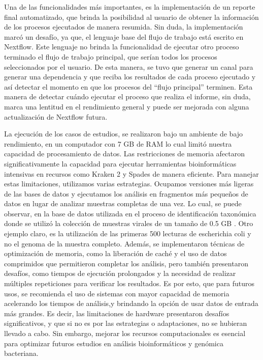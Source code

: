 \documentclass[12pt]{article}
\begin{document}
Una de las funcionalidades más importantes, es la implementación de un reporte final automatizado, que brinda la posibilidad al usuario de obtener la información de los procesos ejecutados de manera resumida. Sin duda, la implementación marcó un desafío, ya que, el lenguaje base del flujo de trabajo está escrito en Nextflow. Este lenguaje no brinda la funcionalidad de ejecutar otro proceso terminado el flujo de trabajo principal, que serían todos los procesos seleccionados por el usuario. De esta manera, se tuvo que generar un canal para generar una dependencia y que reciba los resultados de cada proceso ejecutado y así detectar el momento en que los procesos del “flujo principal” terminen. Esta manera de detectar cuándo ejecutar el proceso que realiza el informe, sin duda, marca una lentitud en el rendimiento general y puede ser mejorada con alguna actualización de Nextflow futura.

	
La ejecución de los casos de estudios, se realizaron bajo un ambiente de bajo rendimiento, en un computador con 7 GB de RAM lo cual limitó nuestra capacidad de procesamiento de datos. Las restricciones de memoria afectaron significativamente la capacidad para ejecutar herramientas bioinformáticas intensivas en recursos como Kraken 2 y Spades de manera eficiente. Para manejar estas limitaciones, utilizamos varias estrategias. Ocupamos versiones más ligeras de las bases de datos y ejecutamos los análisis en fragmentos más pequeños de datos en lugar de analizar muestras completas de una vez. Lo cual, se puede observar, en la base de datos utilizada en el proceso de identificación taxonómica donde se utilizó la colección de muestras virales de un tamaño de 0.5 GB . Otro ejemplo claro, es la utilización de las primeras 500 lecturas de escherichia coli y no el genoma de la muestra completo. Además, se implementaron técnicas de optimización de memoria, como la liberación de caché y el uso de datos comprimidos que permitieron completar los análisis, pero también presentaron desafíos, como tiempos de ejecución prolongados y la necesidad de realizar múltiples repeticiones para verificar los resultados. Es por esto, que para futuros usos, se recomienda el uso de sistemas con mayor capacidad de memoria acelerando los tiempos de análisis,y brindando la opción de usar datos de entrada más grandes. Es decir, las limitaciones de hardware presentaron desafíos significativos, y que si no es por las estrategias o adaptaciones, no se hubieran llevado a cabo. Sin embargo, mejorar los recursos computacionales es esencial para optimizar futuros estudios en análisis bioinformáticos y genómica bacteriana.
\end{document}
